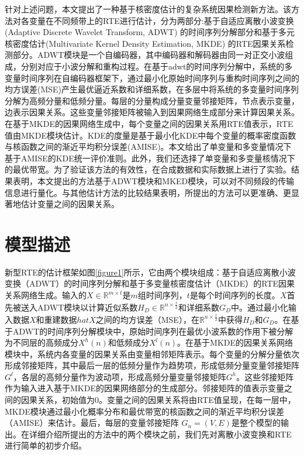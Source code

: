 针对上述问题，本文提出了一种基于核密度估计的复杂系统因果检测新方法。该方法对各变量在不同频带上的RTE进行估计，分为两部分:基于自适应离散小波变换 (Adaptive Discrete Wavelet Transform, ADWT) 的时间序列分解部分和基于多元核密度估计(Multivariate Kernel Density Estimation, MKDE) 的RTE因果关系检测部分。ADWT模块是一个自编码器，其中编码器和解码器由同一对正交小波组成，分别对应于小波分解和重构过程。在基于adwt的时间序列分解中，系统的多变量时间序列在自编码器框架下，通过最小化原始时间序列与重构时间序列之间的均方误差(MSE)产生最优逼近系数和详细系数，在多层中将系统的多变量时间序列分解为高频分量和低频分量。每层的分量构成分量变量邻接矩阵，节点表示变量，边表示因果关系。这些变量邻接矩阵被输入到因果网络生成部分来计算因果关系。在基于MKDE的因果网络生成中，每个变量之间的因果关系用RTE值表示，RTE值由MKDE模块估计。KDE的度量是基于最小化KDE中每个变量的概率密度函数与核函数之间的渐近平均积分误差(AMISE)。本文给出了单变量和多变量情况下基于AMISE的KDE统一评价准则。此外，我们还选择了单变量和多变量核情况下的最优带宽。为了验证该方法的有效性，在合成数据和实际数据上进行了实验。结果表明，本文提出的方法基于ADWT模块和MKED模块，可以对不同频段的传输信息进行量化。与其他估计方法的比较结果表明，所提出的方法可以更准确、更显著地估计变量之间的因果关系。
\section{模型描述}
新型RTE的估计框架如图\ref{figure1}所示，它由两个模块组成：基于自适应离散小波变换（ADWT）的时间序列分解和基于多变量核密度估计（MKDE）的RTE因果关系网络生成。输入的$X\in \mathbb{R}^{m\times t}$是$m$组时间序列，$t$是每个时间序列的长度。$X$首先被送入ADWT模块以计算近似系数$H_{D}\in \mathbb{R}^{n\times\frac{t}{2}}$和详细系数$G_{D}$中。通过最小化输入数据$X$和重建数据$hat{X}$之间的均方误差（MSE），在$\mathbb{R}^{n\times \frac{t}{2}}$中获得$H_{D}$和$G_{D}$。在基于ADWT的时间序列分解模块中，原始时间序列在最优小波系数的作用下被分解为不同层的高频成分$X^{h}(n)$和低频成分$X^{l}(n)$。在基于MKDE的因果关系网络模块中，系统内各变量的因果关系由变量相邻矩阵表示。每个变量的分解分量依次形成邻接矩阵，其中最后一层的低频分量作为趋势项，形成低频分量变量邻接矩阵$G^{l}$，各层的高频分量作为波动项，形成高频分量变量邻接矩阵$G^{h}$。这些邻接矩阵作为输入进入基于MKDE的因果网络部分的生成部分。邻接矩阵的值表示变量之间的因果关系，初始值为0。变量之间的因果关系将由RTE值呈现，在每一层中，MKDE模块通过最小化概率分布和最优带宽的核函数之间的渐近平均积分误差（AMISE）来估计。最后，每层的变量邻接矩阵 $G_{n}=(V, E)$是整个模型的输出。在详细介绍所提出的方法中的两个模块之前，我们先对离散小波变换和RTE进行简单的初步介绍。

